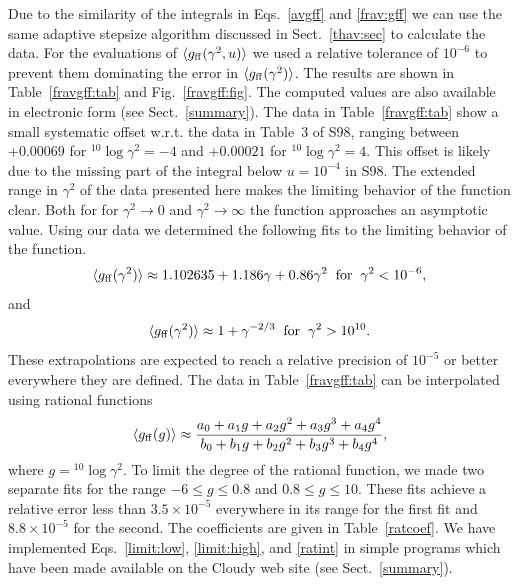 \documentclass[useAMS,usenatbib]{mn2e}
\begin{document}
Due to the similarity of the integrals in Eqs.~\ref{avgff} and \ref{frav:gff}
we can use the same adaptive stepsize algorithm discussed in
Sect.~\ref{thav:sec} to calculate the data. For the evaluations of
\mbox{$\langle g_{\rm ff}(\gamma^2,u)\rangle$} we used a relative tolerance of
$10^{-6}$ to prevent them dominating the error in \mbox{$\langle g_{\rm
    ff}(\gamma^2)\rangle$}. The results are shown in Table~\ref{fravgff:tab}
and Fig.~\ref{fravgff:fig}. The computed values are also available in
electronic form (see Sect.~\ref{summary}). The data in Table~\ref{fravgff:tab}
show a small systematic offset w.r.t. the data in Table~3 of S98, ranging
between $+0.00069$ for ${}^{10}\log\gamma^2 = -4$ and $+0.00021$ for
${}^{10}\log\gamma^2 = 4$. This offset is likely due to the missing part of
the integral below $u = 10^{-4}$ in S98. The extended range in $\gamma^2$ of
the data presented here makes the limiting behavior of the function clear.
Both for for $\gamma^2 \rightarrow 0$ and $\gamma^2 \rightarrow \infty$ the
function approaches an asymptotic value. Using our data we determined the
following fits to the limiting behavior of the function.
\begin{equation}
\langle g_{\rm ff}(\gamma^2)\rangle \approx 1.102635 + 1.186 \gamma + 0.86 \gamma^2
\hspace{2mm} {\rm for} \hspace{2mm} \gamma^2 < 10^{-6},
\label{limit:low}
\end{equation}
and
\begin{equation}
\langle g_{\rm ff}(\gamma^2)\rangle \approx 1 + \gamma^{-2/3}
\hspace{2mm} {\rm for} \hspace{2mm} \gamma^2 > 10^{10}.
\label{limit:high}
\end{equation}
These extrapolations are expected to reach a relative precision of $10^{-5}$
or better everywhere they are defined. The data in Table~\ref{fravgff:tab} can
be interpolated using rational functions
\begin{equation}
\langle g_{\rm ff}(g)\rangle \approx \frac{a_0 + a_1g + a_2g^2 + a_3g^3 + a_4g^4}
{b_0 + b_1g + b_2g^2 + b_3g^3 + b_4g^4},
\label{ratint}
\end{equation}
where $g = {}^{10}\log\gamma^2$. To limit the degree of the rational function,
we made two separate fits for the range $-6 \leq g \leq 0.8$ and $0.8 \leq g
\leq 10$. These fits achieve a relative error less than $3.5\times10^{-5}$
everywhere in its range for the first fit and $8.8\times10^{-5}$ for the
second. The coefficients are given in Table~\ref{ratcoef}. We have implemented
Eqs.~\ref{limit:low}, \ref{limit:high}, and \ref{ratint} in simple programs
which have been made available on the Cloudy web site (see
Sect.~\ref{summary}).
\end{document}
